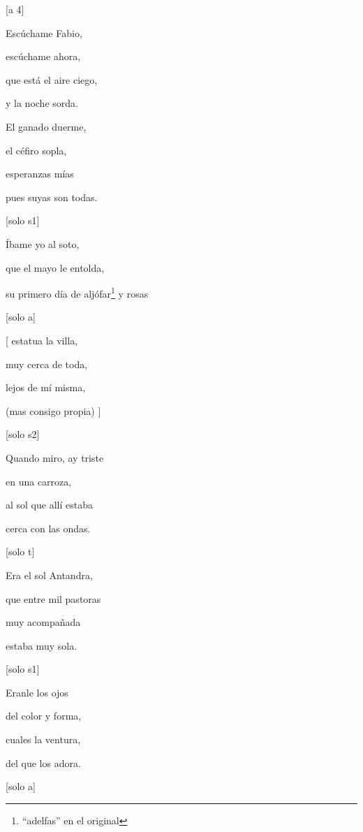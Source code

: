 \centering
\Large{

{[}a 4{]}

Esc{ú}chame Fabio,

esc{ú}chame ahora,

que está el aire ciego,

y la noche sorda.
\vspace{2\baselineskip}

El ganado duerme,

el céfiro sopla,

esperanzas mías

pues suyas son todas.
\vspace{2\baselineskip}

{[}solo s1{]}

Íbame yo al soto,

que el mayo le entolda,

su primero día de aljófar\footnote{\textsuperscript{}``adelfas'' en el original} y rosas
\vspace{2\baselineskip}

{[}solo a{]}

{[} estatua la villa,

  muy cerca de toda,

  lejos de mí misma,

  (mas consigo propia) {]}
\vspace{2\baselineskip}

{[}solo s2{]}

Quando miro, ay triste

en una carroza,

al sol que allí estaba

cerca con las ondas.
\vspace{2\baselineskip}

{[}solo t{]}

Era el sol Antandra,

que entre mil pastoras

muy acompañada

estaba muy sola.
\vspace{2\baselineskip}

{[}solo s1{]}

Eranle los ojos

del color y forma,

cuales la ventura,

del que los adora.
\vspace{2\baselineskip}

{[}solo a{]}

}
